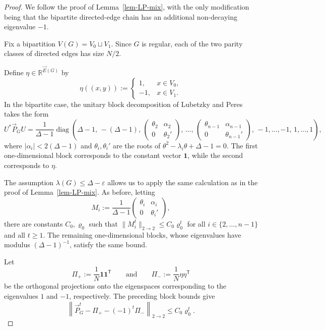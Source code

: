 \documentclass[11pt,a4paper]{article}
\theoremstyle{plain}
\let\rho=\varrho
\begin{document}
\begin{proof}
We follow the proof of Lemma~\ref{lem-LP-mix}, with the only
modification being that the bipartite directed-edge chain has an
additional non-decaying eigenvalue $-1$.

Fix a bipartition
$
V(G)=V_0\sqcup V_1.
$
Since $G$ is regular,
 each of the two parity classes of directed edges has
size $N/2$.

Define $\eta\in\mathbb R^{\vec E(G)}$ by
\[
\eta((x,y))
:=
\begin{cases}
1, & x\in V_0,\\
-1, & x\in V_1.
\end{cases}
\]
In the bipartite case, the unitary block decomposition of Lubetzky and
Peres~\cite[Proposition~3.1]{LubetzkyPeres} takes the form
\[
U^\ast\vec P_GU
=
\frac1{\Delta-1}
\operatorname{diag}\left(
\Delta-1,\,
-(\Delta-1),\,
\begin{pmatrix}
\theta_2&\alpha_2\\
0&\theta_2'
\end{pmatrix},
\,\ldots,\,
\begin{pmatrix}
\theta_{n-1}&\alpha_{n-1}\\
0&\theta_{n-1}'
\end{pmatrix},
\,-1,\ldots,-1,\,
1,\ldots,1
\right),
\]
where $|\alpha_i|<2(\Delta-1)$
and $\theta_i,\theta_i'$ are the roots of
$
\theta^2-\lambda_i\theta+\Delta-1=0.
$
The first one-dimensional block corresponds to the constant vector
$\mathbf 1$, while the second corresponds to $\eta$. 

The assumption $\lambda(G)\le\Delta-\varepsilon$ allows us to apply the same calculation as in the proof of
Lemma~\ref{lem-LP-mix}. As before, letting 
\[
M_i
:=
\frac1{\Delta-1}
\begin{pmatrix}
\theta_i&\alpha_i\\
0&\theta_i'
\end{pmatrix},
\]
there are constants $C_0, \rho_0$ such that 
$
\|M_i^t\|_{2\to2}
\le
C_0\rho_0^t
$
for all $i\in\{2,\ldots,n-1\}$ and all $t\ge1$. The remaining
one-dimensional blocks, whose eigenvalues have modulus
$(\Delta-1)^{-1}$, satisfy the same bound.

Let
\[
\Pi_+
:=
\frac1N\mathbf 1\mathbf 1^{\mathsf T}
\qquad\text{and}\qquad
\Pi_-
:=
\frac1N\eta\eta^{\mathsf T}
\]
be the orthogonal projections onto the eigenspaces corresponding to
the eigenvalues $1$ and $-1$, respectively. The preceding block
bounds give
\begin{equation}\label{eq:P-bipartite-mix-bound}
\left\|
\vec P_G^t-\Pi_+-(-1)^t\Pi_-
\right\|_{2\to2}
\le
C_0\rho_0^t.
\end{equation}


\end{proof}
\end{document}
